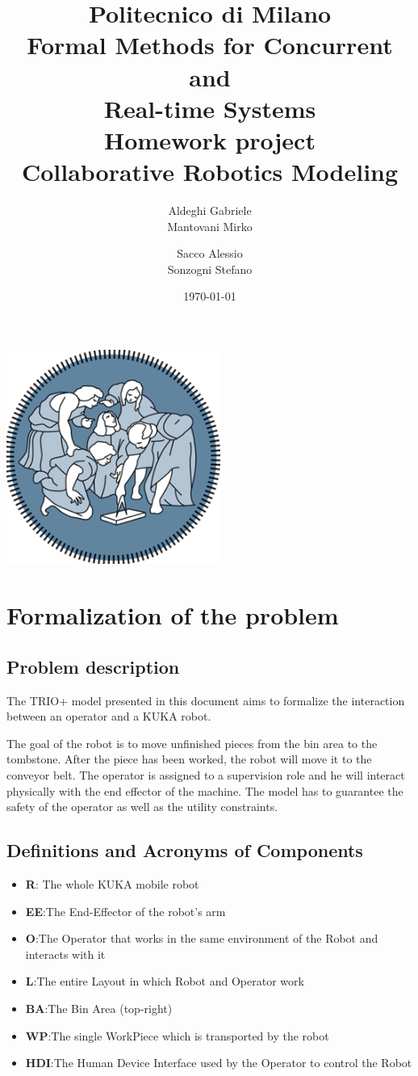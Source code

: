 \documentclass[a4paper]{article}
\title{Politecnico di Milano\\
Formal Methods for Concurrent \\
and \\
Real-time Systems\\
Homework project\\
\textbf{Collaborative Robotics Modeling }}
\author{Aldeghi Gabriele \\
  Mantovani Mirko \and
  Sacco Alessio \\
  Sonzogni Stefano}
\date{\today}
\begin{document}
\maketitle
\begin{center}
    \includegraphics[width=7cm]{images/polimi-logo}
\end{center}
\clearpage
{\hypersetup{hidelinks}\tableofcontents}
\clearpage

\section{Formalization of the problem}
\subsection{Problem description}
The TRIO+ model presented in this document aims to formalize the interaction between an operator and a KUKA robot.

The goal of the robot is to move unfinished pieces from the bin area to the tombstone. After the piece has been worked, the robot will move it to the conveyor belt.
The operator is assigned to a supervision role and he will interact physically with the end effector of the machine. The model has to guarantee the safety of the operator as well as the utility constraints.

\subsection{Definitions and Acronyms of Components}
\begin{itemize}
    \item \textbf{R}: The whole KUKA mobile robot
    \item \textbf{EE}:\@ The End-Effector of the robot's arm
    \item \textbf{O}:\@ The Operator that works in the same environment of the Robot and interacts with it
    \item \textbf{L}:\@ The entire Layout in which Robot and Operator work
    \item \textbf{BA}:\@ The Bin Area (top-right)
    \item \textbf{WP}:\@ The single WorkPiece which is transported by the robot
    \item \textbf{HDI}:\@ The Human Device Interface used by the Operator to control the Robot
\end{itemize}
\end{document}
